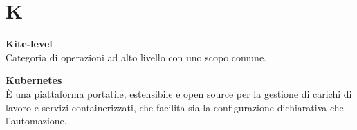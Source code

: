 \section{K}
\textbf{Kite-level}\\
Categoria di operazioni ad alto livello con uno scopo comune.

\textbf{Kubernetes}\\
È una piattaforma portatile, estensibile e open source per la gestione di carichi di lavoro e servizi containerizzati, che facilita sia la configurazione dichiarativa che l'automazione.

\clearpage